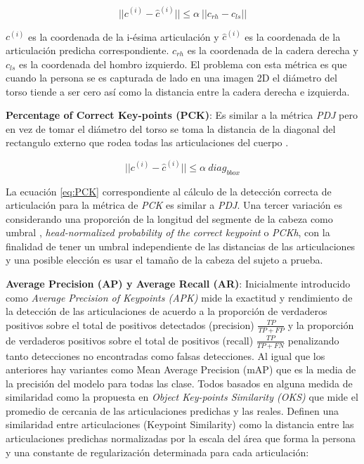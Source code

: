 \begin{equation}
    ||c^{(i)} - \hat{c}^{(i)}|| \le \alpha\ || c_{rh} - c_{ls} ||
    \label{eq:PDJ}
\end{equation}

$c^{(i)}$ es la coordenada de la i-ésima articulación y $\hat c^{(i)}$ es la coordenada de la
articulación predicha correspondiente. $c_{rh}$ es la coordenada de la cadera derecha y $c_{ls}$
es la coordenada del hombro izquierdo. El problema con esta métrica es que cuando la persona se es
capturada de lado en una imagen 2D el diámetro del torso tiende a ser cero así como la distancia
entre la cadera derecha e izquierda.

\textbf{Percentage of Correct Key-points (PCK)}: Es similar a la métrica \textit{PDJ} pero en vez de
tomar el diámetro del torso se toma la distancia de la diagonal del rectangulo externo que rodea
todas las articulaciones del cuerpo \cite{6380498}.

\begin{equation}
    ||c^{(i)} - \hat{c}^{(i)}|| \le \alpha\ diag_{bbox}
    \label{eq:PCK}
\end{equation}

La ecuación \ref{eq:PCK} correspondiente al cálculo de la detección correcta de articulación para la
métrica de \textit{PCK} es similar a \textit{PDJ}. Una tercer variación es considerando una
proporción de la longitud del segmente de la cabeza como umbral \cite{6909866},
\textit{head-normalized probability of the correct keypoint} o \textit{PCKh}, con la finalidad
de tener un umbral independiente de las distancias de las articulaciones y una posible elección
es usar el tamaño de la cabeza del sujeto a prueba.

\textbf{Average Precision (AP) y Average Recall (AR)}: Inicialmente introducido
como  \textit{Average Precision of Keypoints (APK)} \cite{6380498} mide la exactitud y rendimiento
de la detección de las articulaciones de acuerdo a la proporción de verdaderos positivos sobre el
total de positivos detectados (precision) $\frac{TP}{TP + FP}$ y la proporción
de verdaderos positivos sobre el total de positivos (recall) $\frac{TP}{TP + FN}$ penalizando tanto
detecciones no encontradas como falsas detecciones. Al igual que los anteriores hay variantes
como Mean Average Precision (mAP) que es la media de la precisión del modelo para todas las
clase. Todos basados en alguna medida de similaridad como la propuesta en
\textit{Object Key-points Similarity (OKS)} que mide el promedio de cercania de las articulaciones
predichas y las reales. Definen una similaridad entre articulaciones (Keypoint Similarity)
\cite{DBLP:journals/corr/LinMBHPRDZ14}
como la distancia entre las articulaciones predichas normalizadas por la escala del
área que forma la persona y una constante de regularización determinada para cada articulación:

